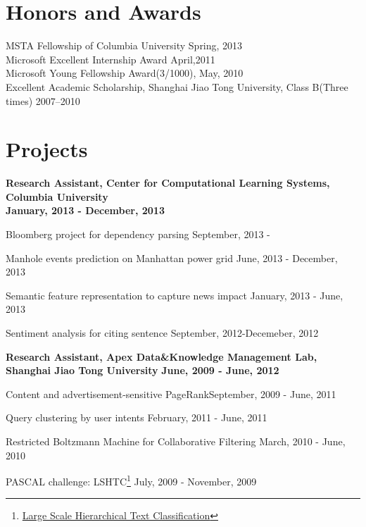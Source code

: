 \documentclass[margin,line]{res}
\newenvironment{list1}{
  \begin{list}{\ding{113}}{%
      \setlength{\itemsep}{0in}
      \setlength{\parsep}{0in} \setlength{\parskip}{0in}
      \setlength{\topsep}{0in} \setlength{\partopsep}{0in} 
      \setlength{\leftmargin}{0.17in}}}{\end{list}}
\begin{document}
\begin{resume}
\section{\sc Honors and Awards} 
MSTA Fellowship of Columbia University \hfill{Spring, 2013}\\
Microsoft Excellent Internship Award \hfill{April,2011}\\
Microsoft Young Fellowship Award(3/1000), \hfill{May, 2010}\\
Excellent Academic Scholarship, Shanghai Jiao Tong University, Class B(Three times) \hfill{2007--2010}\\
\vspace*{-2.5mm}

\section{\sc Projects}
{\bf Research Assistant, Center for Computational Learning Systems,  Columbia University}\\
\hspace*{3pt}\hfill {\bf January, 2013 - December, 2013}
\begin{list1}
\item[] Bloomberg project for dependency parsing \hfill{September, 2013 - }
\item[] Manhole events prediction on Manhattan power grid \hfill{June, 2013 - December, 2013}
\item[] Semantic feature representation to capture news impact \hfill{January, 2013 - June, 2013}\\
\item[]	Sentiment analysis for citing sentence \hfill{September, 2012-Decemeber, 2012}
\end{list1}
\vspace*{-4mm}
{\bf Research Assistant, Apex Data\&Knowledge Management Lab, Shanghai Jiao Tong University} \hfill {\bf June, 2009 - June, 2012}\\
\vspace*{-4mm}
\begin{list1}
\item[] Content and advertisement-sensitive PageRank\hfill {September, 2009 - June, 2011}
\item[] Query clustering by user intents \hfill{February, 2011 - June, 2011}
\item[] Restricted Boltzmann Machine for Collaborative Filtering \hfill{ March, 2010 - June, 2010}
\item[] PASCAL challenge: LSHTC\footnote {\href{http://lshtc.iit.demokritos.gr/}{Large Scale Hierarchical Text Classification}} \hfill{July, 2009 - November, 2009}
\end{list1}

\end{resume}
\end{document}
